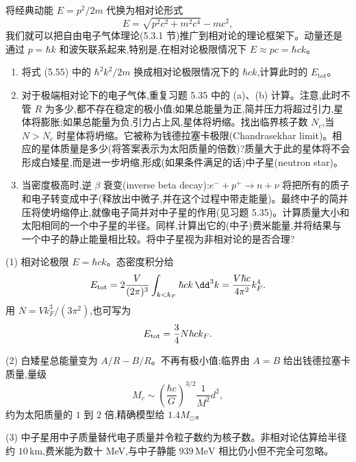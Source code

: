 \begin{question}
将经典动能 $E=p^2/2m$ 代换为相对论形式
\[
E=\sqrt{p^2c^2+m^2c^4}-mc^2,
\]
我们就可以把自由电子气体理论(5.3.1 节)推广到相对论的理论框架下。动量还是通过 $p=\hbar k$ 和波矢联系起来,特别是,在相对论极限情况下 $E\approx pc=\hbar ck$。
\begin{enumerate}
\item 将式 (5.55) 中的 $\hbar^2k^2/2m$ 换成相对论极限情况下的 $\hbar ck$,计算此时的 $E_{\mathrm{tot}}$。
\item 对于极端相对论下的电子气体,重复习题 5.35 中的 (a)、(b) 计算。注意,此时不管 $R$ 为多少,都不存在稳定的极小值;如果总能量为正,简并压力将超过引力,星体将膨胀;如果总能量为负,引力占上风,星体将坍缩。找出临界核子数 $N_c$,当 $N>N_c$ 时星体将坍缩。它被称为钱德拉塞卡极限(Chandrasekhar limit)。相应的星体质量是多少(将答案表示为太阳质量的倍数)?质量大于此的星体将不会形成白矮星,而是进一步坍缩,形成(如果条件满足的话)中子星(neutron star)。
\item 当密度极高时,逆 $\beta$ 衰变(inverse beta decay):$e^-+p^+\to n+\nu$ 将把所有的质子和电子转变成中子(释放出中微子,并在这个过程中带走能量)。最终中子的简并压将使坍缩停止,就像电子简并对中子星的作用(见习题 5.35)。计算质量大小和太阳相同的一个中子星的半径。同样,计算出它的(中子)费米能量,并将结果与一个中子的静止能量相比较。将中子星视为非相对论的是否合理?
\end{enumerate}

\par\smallskip
{}

\end{question}
\begin{solution}

(1) 相对论极限 $E=\hbar ck$。态密度积分给
\[
E_{\rm tot}=2\frac{V}{(2\pi)^3}\int_{k<k_F}\hbar ck\,\dd^3k
=\frac{V\hbar c}{4\pi^2}k_F^4.
\]
用 $N=Vk_F^3/(3\pi^2)$,也可写为
\[
E_{\rm tot}=\frac34N\hbar ck_F.
\]

(2) 白矮星总能量变为 $A/R-B/R$。不再有极小值;临界由 $A=B$ 给出钱德拉塞卡质量,量级
\[
M_c\sim \left(\frac{\hbar c}{G}\right)^{3/2}\frac{1}{M^2}d^2,
\]
约为太阳质量的 $1$ 到 $2$ 倍,精确模型给 $1.4M_\odot$。

(3) 中子星用中子质量替代电子质量并令粒子数约为核子数。非相对论估算给半径约 $10\,\mathrm{km}$,费米能为数十 MeV,与中子静能 $939\,\mathrm{MeV}$ 相比仍小但不完全可忽略。

\end{solution}

